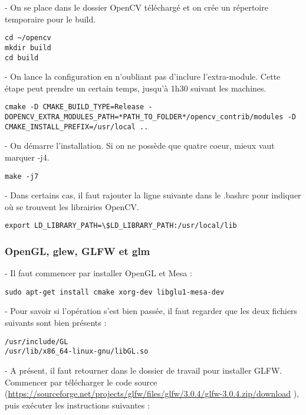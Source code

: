 - On se place dans le dossier OpenCV téléchargé et on crée un répertoire temporaire pour le build.

\begin{verbatim}
cd ~/opencv
mkdir build
cd build
\end{verbatim}

- On lance la configuration en n'oubliant pas d'inclure l'extra-module. Cette étape peut prendre un certain temps, jusqu'à 1h30 suivant les machines.

\begin{verbatim}
cmake -D CMAKE_BUILD_TYPE=Release -DOPENCV_EXTRA_MODULES_PATH=*PATH_TO_FOLDER*/opencv_contrib/modules -D CMAKE_INSTALL_PREFIX=/usr/local ..
\end{verbatim}

- On démarre l'installation. Si on ne possède que quatre coeur, mieux vaut marquer -j4.

\begin{verbatim}
make -j7
\end{verbatim}

- Dans certains cas, il faut rajouter la ligne suivante dans le .bashrc pour indiquer où se trouvent les librairies OpenCV.

\begin{verbatim}
export LD_LIBRARY_PATH=\$LD_LIBRARY_PATH:/usr/local/lib
\end{verbatim}


\subsubsection{OpenGL, glew, GLFW et glm}

- Il faut commencer par installer OpenGL et Mesa :

\begin{verbatim}
sudo apt-get install cmake xorg-dev libglu1-mesa-dev
\end{verbatim}

- Pour savoir si l'opération s'est bien passée, il faut regarder que les deux fichiers suivants sont bien présents :

\begin{verbatim}
/usr/include/GL
/usr/lib/x86_64-linux-gnu/libGL.so
\end{verbatim}

- A présent, il faut retourner dans le dossier de travail pour installer GLFW. Commencer par télécharger le code source (\url{https://sourceforge.net/projects/glfw/files/glfw/3.0.4/glfw-3.0.4.zip/download} ), puis exécuter les instructions suivantes :

